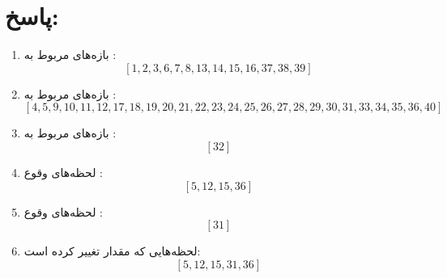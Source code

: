 \section*{پاسخ:}

\begin{enumerate}[label=\alph*)]
\item 
بازه‌های مربوط به :  
\[
[1, 2, 3, 6, 7, 8, 13, 14, 15, 16, 37, 38, 39]
\]

\item 
بازه‌های مربوط به :  
\[
[4, 5, 9, 10, 11, 12, 17, 18, 19, 20, 21, 22, 23, 24, 25, 26, 27, 28, 29, 30, 31, 33, 34, 35, 36, 40]
\]

\item 
بازه‌های مربوط به :  
\[
[32]
\]

\item 
لحظه‌های وقوع :  
\[
[5, 12, 15, 36]
\]

\item 
لحظه‌های وقوع :  
\[
[31]
\]

\item 
لحظه‌هایی که مقدار  تغییر کرده است:  
\[
[5, 12, 15, 31, 36]
\]

\end{enumerate}